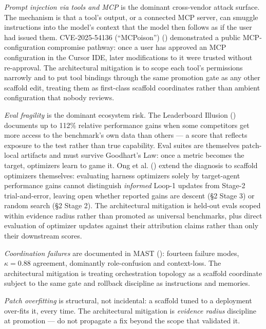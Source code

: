 \documentclass[
]{article}
\begin{document}
\emph{Prompt injection via tools and MCP} is the dominant cross-vendor
attack surface. The mechanism is that a tool's output, or a connected
MCP server, can smuggle instructions into the model's context that the
model then follows as if the user had issued them. CVE-2025-54136
(``MCPoison'') () demonstrated a public MCP-configuration compromise
pathway: once a user has approved an MCP configuration in the Cursor
IDE, later modifications to it were trusted without re-approval. The
architectural mitigation is to scope each tool's permissions narrowly
and to put tool bindings through the same promotion gate as any other
scaffold edit, treating them as first-class scaffold coordinates rather
than ambient configuration that nobody reviews.

\emph{Eval fragility} is the dominant ecosystem risk. The Leaderboard
Illusion ()
documents up to 112\% relative performance gains when some competitors
get more access to the benchmark's own data than others --- a score that
reflects exposure to the test rather than true capability. Eval suites
are themselves patch-local artifacts and must survive Goodhart's Law:
once a metric becomes the target, optimizers learn to game it. Ong et
al. () extend the diagnosis to
scaffold optimizers themselves: evaluating harness optimizers solely by
target-agent performance gains cannot distinguish \emph{informed} Loop-1
updates from Stage-2 trial-and-error, leaving open whether reported
gains are descent (§2 Stage 3) or random search (§2 Stage 2). The
architectural mitigation is held-out evals scoped within evidence radius
rather than promoted as universal benchmarks, plus direct evaluation of
optimizer updates against their attribution claims rather than only
their downstream scores.

\emph{Coordination failures} are documented in MAST
(): fourteen failure
modes, \(\kappa = 0.88\) agreement, dominantly role-confusion and
context-loss. The architectural mitigation is treating orchestration
topology as a scaffold coordinate subject to the same gate and rollback
discipline as instructions and memories.

\emph{Patch overfitting} is structural, not incidental: a scaffold tuned
to a deployment over-fits it, every time. The architectural mitigation
is \emph{evidence radius} discipline at promotion --- do not propagate a
fix beyond the scope that validated it.
\end{document}
